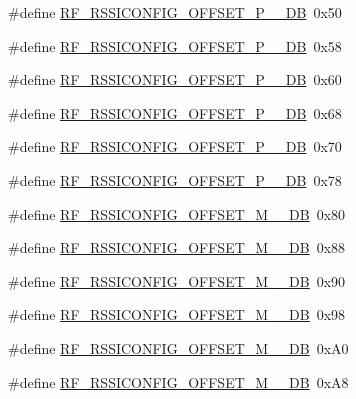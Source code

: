 \begin{DoxyCompactItemize}
\item 
\#define \mbox{\hyperlink{sx1276_regs-_fsk_8h_afbfdf21feffd708399f947db0aa2bc09}{R\+F\+\_\+\+R\+S\+S\+I\+C\+O\+N\+F\+I\+G\+\_\+\+O\+F\+F\+S\+E\+T\+\_\+\+P\+\_\+\_\+\+DB}}~0x50
\item 
\#define \mbox{\hyperlink{sx1276_regs-_fsk_8h_ae11e2cc321929764afe9df5c5bb750ea}{R\+F\+\_\+\+R\+S\+S\+I\+C\+O\+N\+F\+I\+G\+\_\+\+O\+F\+F\+S\+E\+T\+\_\+\+P\+\_\+\_\+\+DB}}~0x58
\item 
\#define \mbox{\hyperlink{sx1276_regs-_fsk_8h_abce6efdb35695bf504c61bc91edd06bd}{R\+F\+\_\+\+R\+S\+S\+I\+C\+O\+N\+F\+I\+G\+\_\+\+O\+F\+F\+S\+E\+T\+\_\+\+P\+\_\+\_\+\+DB}}~0x60
\item 
\#define \mbox{\hyperlink{sx1276_regs-_fsk_8h_a636e0b5757980dd446fd0f8d68ff7bec}{R\+F\+\_\+\+R\+S\+S\+I\+C\+O\+N\+F\+I\+G\+\_\+\+O\+F\+F\+S\+E\+T\+\_\+\+P\+\_\+\_\+\+DB}}~0x68
\item 
\#define \mbox{\hyperlink{sx1276_regs-_fsk_8h_adb4617e4a26c0967429266f47635854c}{R\+F\+\_\+\+R\+S\+S\+I\+C\+O\+N\+F\+I\+G\+\_\+\+O\+F\+F\+S\+E\+T\+\_\+\+P\+\_\+\_\+\+DB}}~0x70
\item 
\#define \mbox{\hyperlink{sx1276_regs-_fsk_8h_a9bc9864b2deb63ce4851767aa20d13fe}{R\+F\+\_\+\+R\+S\+S\+I\+C\+O\+N\+F\+I\+G\+\_\+\+O\+F\+F\+S\+E\+T\+\_\+\+P\+\_\+\_\+\+DB}}~0x78
\item 
\#define \mbox{\hyperlink{sx1276_regs-_fsk_8h_aeffccc68b7d23a19aaa8af6531d2d2ce}{R\+F\+\_\+\+R\+S\+S\+I\+C\+O\+N\+F\+I\+G\+\_\+\+O\+F\+F\+S\+E\+T\+\_\+\+M\+\_\+\_\+\+DB}}~0x80
\item 
\#define \mbox{\hyperlink{sx1276_regs-_fsk_8h_ad7fb49ed509ef7fb18fadda22bf06f11}{R\+F\+\_\+\+R\+S\+S\+I\+C\+O\+N\+F\+I\+G\+\_\+\+O\+F\+F\+S\+E\+T\+\_\+\+M\+\_\+\_\+\+DB}}~0x88
\item 
\#define \mbox{\hyperlink{sx1276_regs-_fsk_8h_abbd9ed83c6fbecfcce7c527e34d04ec0}{R\+F\+\_\+\+R\+S\+S\+I\+C\+O\+N\+F\+I\+G\+\_\+\+O\+F\+F\+S\+E\+T\+\_\+\+M\+\_\+\_\+\+DB}}~0x90
\item 
\#define \mbox{\hyperlink{sx1276_regs-_fsk_8h_ae0e47dc6a207da992b1ac902a110f9d7}{R\+F\+\_\+\+R\+S\+S\+I\+C\+O\+N\+F\+I\+G\+\_\+\+O\+F\+F\+S\+E\+T\+\_\+\+M\+\_\+\_\+\+DB}}~0x98
\item 
\#define \mbox{\hyperlink{sx1276_regs-_fsk_8h_a3e5e74a8043abbe4a998705c64a85970}{R\+F\+\_\+\+R\+S\+S\+I\+C\+O\+N\+F\+I\+G\+\_\+\+O\+F\+F\+S\+E\+T\+\_\+\+M\+\_\+\_\+\+DB}}~0x\+A0
\item 
\#define \mbox{\hyperlink{sx1276_regs-_fsk_8h_aba0e0493c2206484248dda87b2ca7134}{R\+F\+\_\+\+R\+S\+S\+I\+C\+O\+N\+F\+I\+G\+\_\+\+O\+F\+F\+S\+E\+T\+\_\+\+M\+\_\+\_\+\+DB}}~0x\+A8

\end{DoxyCompactItemize}
